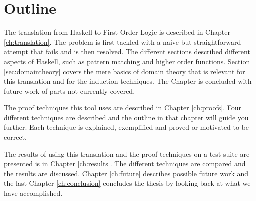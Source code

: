 
\section{Outline}

The translation from Haskell to First Order Logic is described in
Chapter \ref{ch:translation}. The problem is first tackled with a
naive but straightforward attempt that fails and is then resolved. The
different sections described different aspects of Haskell, such as
pattern matching and higher order functions.  Section
\ref{sec:domaintheory} covers the mere basics of domain theory that is
relevant for this translation and for the induction techniques.  The
Chapter is concluded with future work of parts not currently covered.

The proof techniques this tool uses are described in Chapter
\ref{ch:proofs}. Four different techniques are described and the
outline in that chapter will guide you further. Each technique is
explained, exemplified and proved or motivated to be correct.

The results of using this translation and the proof techniques on a
test suite are presented is in Chapter \ref{ch:results}. The different
techniques are compared and the results are discussed.  Chapter
\ref{ch:future} describes possible future work and the last Chapter
\ref{ch:conclusion} concludes the thesis by looking back at what we
have accomplished.
